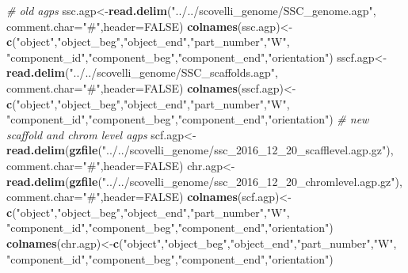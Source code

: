 \documentclass[11pt,]{article}
\newenvironment{Shaded}{\begin{snugshade}}{\end{snugshade}}
\newcommand{\KeywordTok}[1]{\textcolor[rgb]{0.13,0.29,0.53}{\textbf{#1}}}
\newcommand{\DataTypeTok}[1]{\textcolor[rgb]{0.13,0.29,0.53}{#1}}
\newcommand{\StringTok}[1]{\textcolor[rgb]{0.31,0.60,0.02}{#1}}
\newcommand{\CommentTok}[1]{\textcolor[rgb]{0.56,0.35,0.01}{\textit{#1}}}
\newcommand{\OtherTok}[1]{\textcolor[rgb]{0.56,0.35,0.01}{#1}}
\newcommand{\NormalTok}[1]{#1}
\begin{document}
\begin{Shaded}
\begin{Highlighting}[]
\CommentTok{# old agps}
\NormalTok{ssc.agp<-}\KeywordTok{read.delim}\NormalTok{(}\StringTok{"../../scovelli_genome/SSC_genome.agp"}\NormalTok{,}
                    \DataTypeTok{comment.char=}\StringTok{"#"}\NormalTok{,}\DataTypeTok{header=}\OtherTok{FALSE}\NormalTok{)}
\KeywordTok{colnames}\NormalTok{(ssc.agp)<-}\KeywordTok{c}\NormalTok{(}\StringTok{"object"}\NormalTok{,}\StringTok{"object_beg"}\NormalTok{,}\StringTok{"object_end"}\NormalTok{,}\StringTok{"part_number"}\NormalTok{,}\StringTok{"W"}\NormalTok{,}
                     \StringTok{"component_id"}\NormalTok{,}\StringTok{"component_beg"}\NormalTok{,}\StringTok{"component_end"}\NormalTok{,}\StringTok{"orientation"}\NormalTok{)}
\NormalTok{sscf.agp<-}\KeywordTok{read.delim}\NormalTok{(}\StringTok{"../../scovelli_genome/SSC_scaffolds.agp"}\NormalTok{,}
                     \DataTypeTok{comment.char=}\StringTok{"#"}\NormalTok{,}\DataTypeTok{header=}\OtherTok{FALSE}\NormalTok{)}
\KeywordTok{colnames}\NormalTok{(sscf.agp)<-}\KeywordTok{c}\NormalTok{(}\StringTok{"object"}\NormalTok{,}\StringTok{"object_beg"}\NormalTok{,}\StringTok{"object_end"}\NormalTok{,}\StringTok{"part_number"}\NormalTok{,}\StringTok{"W"}\NormalTok{,}
                      \StringTok{"component_id"}\NormalTok{,}\StringTok{"component_beg"}\NormalTok{,}\StringTok{"component_end"}\NormalTok{,}\StringTok{"orientation"}\NormalTok{)}
\CommentTok{# new scaffold and chrom level agps}
\NormalTok{scf.agp<-}\KeywordTok{read.delim}\NormalTok{(}\KeywordTok{gzfile}\NormalTok{(}\StringTok{"../../scovelli_genome/ssc_2016_12_20_scafflevel.agp.gz"}\NormalTok{),}
                    \DataTypeTok{comment.char=}\StringTok{"#"}\NormalTok{,}\DataTypeTok{header=}\OtherTok{FALSE}\NormalTok{)}
\NormalTok{chr.agp<-}\KeywordTok{read.delim}\NormalTok{(}\KeywordTok{gzfile}\NormalTok{(}\StringTok{"../../scovelli_genome/ssc_2016_12_20_chromlevel.agp.gz"}\NormalTok{),}
                    \DataTypeTok{comment.char=}\StringTok{"#"}\NormalTok{,}\DataTypeTok{header=}\OtherTok{FALSE}\NormalTok{)}
\KeywordTok{colnames}\NormalTok{(scf.agp)<-}\KeywordTok{c}\NormalTok{(}\StringTok{"object"}\NormalTok{,}\StringTok{"object_beg"}\NormalTok{,}\StringTok{"object_end"}\NormalTok{,}\StringTok{"part_number"}\NormalTok{,}\StringTok{"W"}\NormalTok{,}
                     \StringTok{"component_id"}\NormalTok{,}\StringTok{"component_beg"}\NormalTok{,}\StringTok{"component_end"}\NormalTok{,}\StringTok{"orientation"}\NormalTok{)}
\KeywordTok{colnames}\NormalTok{(chr.agp)<-}\KeywordTok{c}\NormalTok{(}\StringTok{"object"}\NormalTok{,}\StringTok{"object_beg"}\NormalTok{,}\StringTok{"object_end"}\NormalTok{,}\StringTok{"part_number"}\NormalTok{,}\StringTok{"W"}\NormalTok{,}
                     \StringTok{"component_id"}\NormalTok{,}\StringTok{"component_beg"}\NormalTok{,}\StringTok{"component_end"}\NormalTok{,}\StringTok{"orientation"}\NormalTok{)}
\end{Highlighting}
\end{Shaded}
\end{document}
